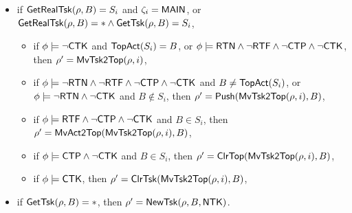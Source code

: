 {\begin{itemize}
\begin{itemize}
            \begin{itemize}
            \item if $\phi\models\neg\ctkflag$ and $\topact(S_i) = B$, 
                or $\phi\models\neg\rtfflag\wedge\neg\ctpflag\wedge\neg\ctkflag$,
                then $\rho'=\mvtsktop(\rho, i)$,
            \item if $\phi\models(\rtfflag\vee\ctpflag)\wedge\neg\ctkflag$ and $B\notin S_i$, 
                then $\rho'=\push(\mvtsktop(\rho, i), B)$,
            \item if $\phi \models \rtfflag \wedge \neg \ctpflag\wedge\neg\ctkflag$ and $B \in S_i$, then 
                $\rho'=\mvacttop(\mvtsktop(\rho, i), B)$,
            \item if $\phi \models\ctpflag\wedge\neg\ctkflag$ and $B \in S_i$, then 
                $\rho' =\clrtop(\mvtsktop(\rho, i), B)$,
            \item if $\phi \models\ctkflag$, then
            $\rho' = \clrtsk(\mvtsktop(\rho, i), B)$,
            \end{itemize}
            \item if $\mathsf{GetRealTsk}(\rho, B) = S_i$ and $\zeta_i={\sf MAIN}$,
        or $ \mathsf{GetRealTsk}(\rho, B) = * \wedge \mathsf{GetTsk}(\rho, B) = S_i$, 
		\begin{itemize}
            \item if $\phi \models \neg\ctkflag$ and $\topact(S_i) = B$, 
            or $\phi\models{\sf RTN}\wedge\neg{\sf RTF}\wedge\neg{\sf CTP}\wedge\neg{\sf CTK}$,
            then $\rho' = \mvtsktop(\rho, i)$,
            \item if $\phi\models\neg{\sf RTN}\wedge\neg{\sf RTF}\wedge\neg{\sf CTP}\wedge\neg{\sf CTK}$ and $B\neq\mathsf{TopAct}(S_i)$,
                or $\phi\models\neg{\sf RTN}\wedge\neg{\sf CTK}$ and $B\notin S_i$,
                    then $\rho'=\push(\mvtsktop(\rho, i), B)$,
            \item if $\phi \models \rtfflag \wedge \neg \ctpflag\wedge\neg\ctkflag$ and $B \in S_i$, then 
                $\rho'=\mvacttop(\mvtsktop(\rho, i), B)$,
            \item if $\phi \models\ctpflag\wedge\neg\ctkflag$ and $B \in S_i$, 
                then $\rho' =\clrtop(\mvtsktop(\rho, i), B)$,
            \item if $\phi \models\ctkflag$, then
            $\rho' = \clrtsk(\mvtsktop(\rho, i), B)$,
		\end{itemize}
		\item if $\mathsf{GetTsk}(\rho, B) = *$, then $\rho' = \mathsf{NewTsk}(\rho, B, {\sf NTK})$.
	\end{itemize}
	

\end{itemize}}

